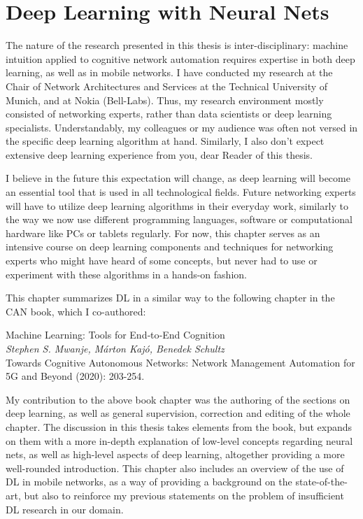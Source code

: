 \chapter{Deep Learning with Neural Nets}
	\label{cha:deep_learning}

	The nature of the research presented in this thesis is inter-disciplinary: machine intuition applied to cognitive network automation requires expertise in both deep learning, as well as in mobile networks.
	I have conducted my research at the Chair of Network Architectures and Services at the Technical University of Munich, and at Nokia (Bell-Labs).
	Thus, my research environment mostly consisted of networking experts, rather than data scientists or deep learning specialists.
	Understandably, my colleagues or my audience was often not versed in the specific deep learning algorithm at hand.
	Similarly, I also don't expect extensive deep learning experience from you, dear Reader of this thesis.
	
	I believe in the future this expectation will change, as deep learning will become an essential tool that is used in all technological fields.
	Future networking experts will have to utilize deep learning algorithms in their everyday work, similarly to the way we now use different programming languages, software or computational hardware like PCs or tablets regularly.
	For now, this chapter serves as an intensive course on deep learning components and techniques for networking experts who might have heard of some concepts, but never had to use or experiment with these algorithms in a hands-on fashion.
	
	This chapter summarizes \ac{DL} in a similar way to the following chapter in the \ac{CAN} book, which I co-authored:
	
	\begin{publication}
		Machine Learning: Tools for End‐to‐End Cognition \\
		\textit{Stephen S. Mwanje, Márton Kajó, Benedek Schultz} \\
		Towards Cognitive Autonomous Networks: Network Management Automation for 5G and Beyond (2020): 203-254.
	\end{publication}

	My contribution to the above book chapter was the authoring of the sections on deep learning, as well as general supervision, correction and editing of the whole chapter.
	The discussion in this thesis takes elements from the book, but expands on them with a more in-depth explanation of low-level concepts regarding neural nets, as well as high-level aspects of deep learning, altogether providing a more well-rounded introduction.
	This chapter also includes an overview of the use of \ac{DL} in mobile networks, as a way of providing a background on the state-of-the-art, but also to reinforce my previous statements on the problem of insufficient \ac{DL} research in our domain.
	
